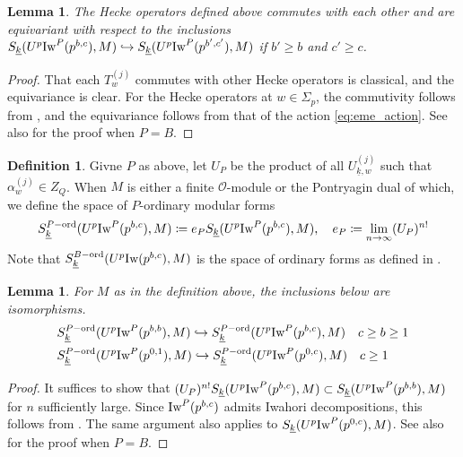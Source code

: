 \documentclass[leqno]{amsart}
\newcommand{\wt}[1]{\underline{ #1 }}
\newcommand{\Iw}{\textnormal{Iw}}
\newcommand{\ord}{\textnormal{ord}}
\newcommand{\oo}{\mathcal{O}} %
\newtheorem{lem}[thm]{Lemma}
\theoremstyle{definition}
\newtheorem{defn}[thm]{Definition}
\theoremstyle{remark}
\begin{document}
\begin{lem}
The Hecke operators defined above commutes with each other
and are equivariant with respect to the inclusions
$ S_{\wt{k}}(U^p\Iw^P(p^{b,c}),M)\hookrightarrow
S_{\wt{k}}(U^p\Iw^P(p^{b',c'}),M)$
if $b'\geq b$ and $c'\geq c$.
\end{lem}
\begin{proof}
That each $T_w^{(j)}$ commutes with other Hecke operators is classical,
and the equivariance is clear.
For the Hecke operators at  $w\in \Sigma_p$,
the commutivity follows from \cite[Lem 3.1.4]{emeI},
and the equivariance follows from 
that of the action \eqref{eq:eme_action}.
See also \cite[Lem 2.10]{ger} for the proof when $P=B$.
\end{proof}



\begin{defn}
	Givne $P$ as above,
	let $U_P$ be the product of all  $U_{\wt{k},w}^{(j)}$
	such that $\alpha_w^{(j)}\in Z_Q$.
	When $M$ is either a finite  $\oo$-module
	or the Pontryagin dual of which,
	we define the space of $P$-ordinary modular forms
	\[
	S_{\wt{k}}^{P-\ord}(U^p\Iw^P(p^{b,c}),M)\coloneqq
		e_PS_{\wt{k}}(U^p\Iw^P(p^{b,c}),M),\quad
		e_P\coloneqq\lim_{n\to \infty}(U_P)^{n!}
	\]
	Note that
	$S_{\wt{k}}^{B-\ord}(U^p\Iw(p^{b,c}),M)$ 
	is the space of ordinary forms as defined in 
	\cite[Def 2.13]{ger}.
\end{defn}

\begin{lem}
	For $M$ as in the definition above,
	the inclusions below are isomorphisms.
	\begin{align*}
	&S_{\wt{k}}^{P-\ord}(U^p\Iw^P(p^{b,b}),M)\hookrightarrow	
	S_{\wt{k}}^{P-\ord}(U^p\Iw^P(p^{b,c}),M)\quad c\geq b\geq 1\\
	&S_{\wt{k}}^{P-\ord}(U^p\Iw^P(p^{0,1}),M)\hookrightarrow	
	S_{\wt{k}}^{P-\ord}(U^p\Iw^P(p^{0,c}),M)\quad c\geq 1
	\end{align*}
\end{lem}
\begin{proof}
	It suffices to show that 
	$(U_P)^{n!}S_{\wt{k}}(U^p\Iw^P(p^{b,c}),M)
	\subset S_{\wt{k}}(U^p\Iw^P(p^{b,b}),M)$
	for $n$ sufficiently large. 
	Since $\Iw^P(p^{b,c})$ admits Iwahori decompositions,
	this follows from \cite[Lem 3.3.2]{emeI}.
	The same argument also applies to 
	$S_{\wt{k}}(U^p\Iw^P(p^{0,c}),M)$.
	See also \cite[Lem 2.19]{ger} for the proof when $P=B$.
\end{proof}
\end{document}
